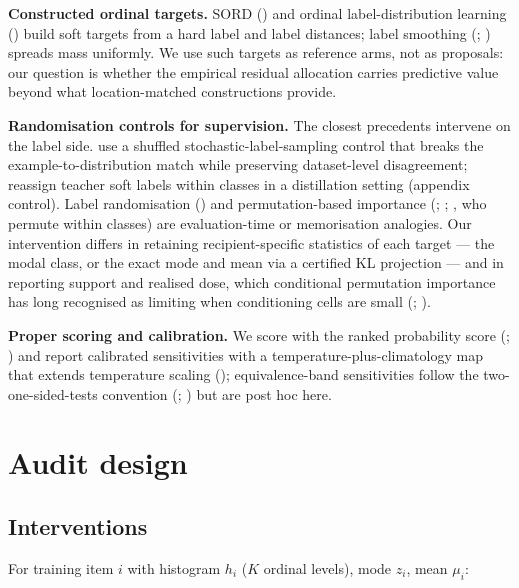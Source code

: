 \documentclass[10pt]{article}
\begin{document}
\textbf{Constructed ordinal targets.} SORD (\citealp{diaz2019soft}) and ordinal label-distribution learning (\citealp{wen2023ordinal}) build soft targets from a hard label and label distances; label smoothing (\citealp{szegedy2016rethinking}; \citealp{muller2019when}) spreads mass uniformly. We use such targets as reference arms, not as proposals: our question is whether the empirical residual allocation carries predictive value beyond what location-matched constructions provide.

\textbf{Randomisation controls for supervision.} The closest precedents intervene on the label side. \citet{gheibi2026same} use a shuffled stochastic-label-sampling control that breaks the example-to-distribution match while preserving dataset-level disagreement; \citet{behrens2026dataset} reassign teacher soft labels within classes in a distillation setting (appendix control). Label randomisation (\citealp{zhang2017understanding}) and permutation-based importance (\citealp{breiman2001random}; \citealp{fisher2019all}; \citealp{ojala2010permutation}, who permute within classes) are evaluation-time or memorisation analogies. Our intervention differs in retaining recipient-specific statistics of each target --- the modal class, or the exact mode and mean via a certified KL projection --- and in reporting support and realised dose, which conditional permutation importance has long recognised as limiting when conditioning cells are small (\citealp{strobl2008conditional}; \citealp{debeer2020conditional}).

\textbf{Proper scoring and calibration.} We score with the ranked probability score (\citealp{epstein1969scoring}; \citealp{gneiting2007strictly}) and report calibrated sensitivities with a temperature-plus-climatology map that extends temperature scaling (\citealp{guo2017calibration}); equivalence-band sensitivities follow the two-one-sided-tests convention (\citealp{schuirmann1987comparison}; \citealp{lakens2017equivalence}) but are post hoc here.

\section{Audit design}

\subsection{Interventions}

For training item \(i\) with histogram \(h_i\) (\(K\) ordinal levels), mode \(z_i\), mean \(\mu_i\):
\end{document}
